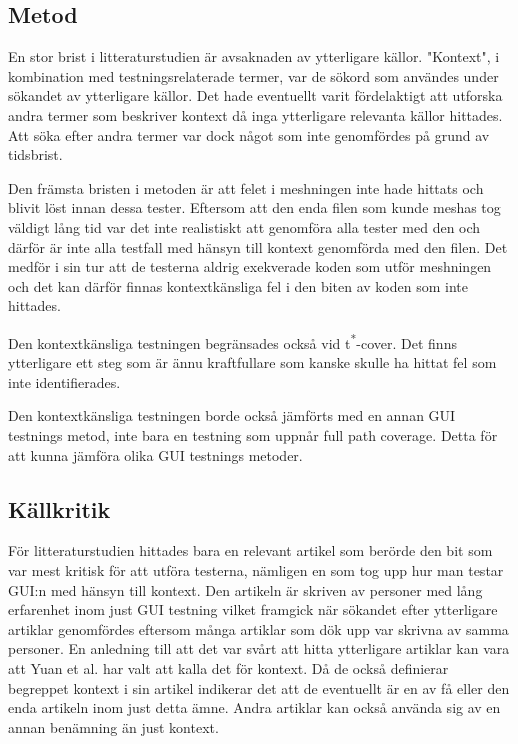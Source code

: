\subsection{Metod}

En stor brist i litteraturstudien är avsaknaden av ytterligare källor. "Kontext", i kombination med testningsrelaterade termer, var de sökord som användes under sökandet av ytterligare källor. Det hade eventuellt varit fördelaktigt att utforska andra termer som beskriver kontext då inga ytterligare relevanta källor hittades. Att söka efter andra termer var dock något som inte genomfördes på grund av tidsbrist.

Den främsta bristen i metoden är att felet i meshningen inte hade hittats och blivit löst innan dessa tester. Eftersom att den enda filen som kunde meshas tog väldigt lång tid var det inte realistiskt att genomföra alla tester med den och därför är inte alla testfall med hänsyn till kontext genomförda med den filen. Det medför i sin tur att de testerna aldrig exekverade koden som utför meshningen och det kan därför finnas kontextkänsliga fel i den biten av koden som inte hittades.

Den kontextkänsliga testningen begränsades också vid t\textsuperscript{*}-cover. Det finns ytterligare ett steg som är ännu kraftfullare som kanske skulle ha hittat fel som inte identifierades.

Den kontextkänsliga testningen borde också jämförts med en annan GUI testnings metod, inte bara en testning som uppnår full path coverage. Detta för att kunna jämföra olika GUI testnings metoder.

\subsection{Källkritik}

För litteraturstudien hittades bara en relevant artikel som berörde den bit som var mest kritisk för att utföra testerna, nämligen en som tog upp hur man testar GUI:n med hänsyn till kontext. Den artikeln är skriven av personer med lång erfarenhet inom just GUI testning vilket framgick när sökandet efter ytterligare artiklar genomfördes eftersom många artiklar som dök upp var skrivna av samma personer. En anledning  till att det var svårt att hitta ytterligare artiklar kan vara att Yuan et al. \cite{yuan2011gui} har valt att kalla det för kontext. Då de också definierar begreppet kontext i sin artikel indikerar det att de eventuellt är en av få eller den enda artikeln inom just detta ämne. Andra artiklar kan också använda sig av en annan benämning än just kontext.

